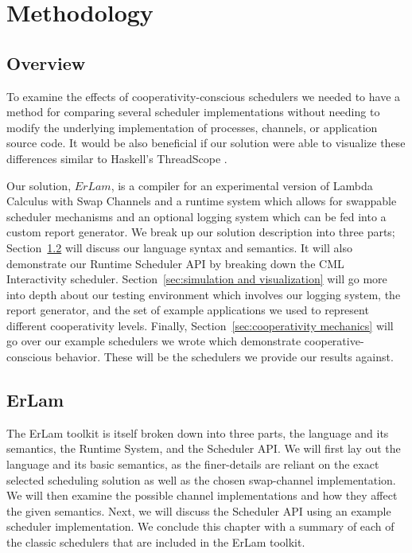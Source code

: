 \chapter{Methodology}
%
\label{chap:methodology}

\section{Overview}\label{sec:method overview}

To examine the effects of cooperativity-conscious schedulers we needed to have 
a method for comparing several scheduler implementations without needing to 
modify the underlying implementation of processes, channels, or application
source code. It would be also beneficial if our solution were able to visualize
these differences similar to Haskell's ThreadScope \cite{jones2009parallel}.

Our solution, $ErLam$, is a compiler for an experimental version of Lambda 
Calculus with Swap Channels and a runtime system which allows for swappable 
scheduler mechanisms and an optional logging system which can be fed into a 
custom report generator.
We break up our solution description into three parts; 
Section~\ref{sec:erlam}
will discuss our language syntax and semantics. It will also demonstrate our
Runtime Scheduler API by breaking down the CML Interactivity scheduler. 
Section~\ref{sec:simulation and visualization} 
will go more into depth about
our testing environment which involves our logging system, the report generator,
and the set of example applications we used to represent different cooperativity
levels. 
Finally, Section~\ref{sec:cooperativity mechanics} will go over our
example schedulers we wrote which demonstrate cooperative-conscious behavior. 
These will be the schedulers we provide our results against.

\section{ErLam}\label{sec:erlam}

The ErLam toolkit is itself broken down into three parts, the language and its
semantics, the Runtime System, and the Scheduler API. We will first lay out the
language and its basic semantics, as the finer-details are reliant on the exact
selected scheduling solution as well as the chosen swap-channel implementation.
We will then examine the possible channel implementations and how they affect
the given semantics. Next, we will discuss the Scheduler API using an example
scheduler implementation. We conclude this chapter with a summary of each of the 
classic schedulers that are included in the ErLam toolkit.

